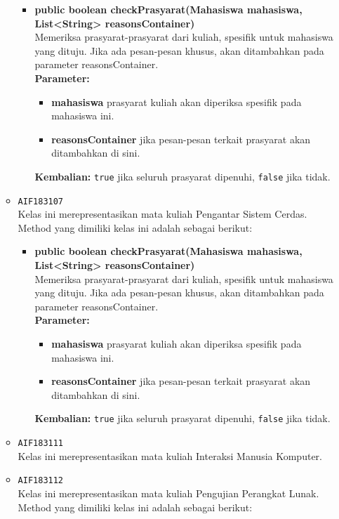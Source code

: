 \begin{enumerate}
\begin{itemize}
\begin{itemize}
\item \textbf{public boolean checkPrasyarat(Mahasiswa mahasiswa, List<String> reasonsContainer)}\\
Memeriksa prasyarat-prasyarat dari kuliah, spesifik untuk mahasiswa yang dituju. Jika ada pesan-pesan khusus, akan ditambahkan pada parameter reasonsContainer.\\
\textbf{Parameter:}
\begin{itemize}
\item \textbf{mahasiswa} prasyarat kuliah akan diperiksa spesifik pada mahasiswa ini.
\item \textbf{reasonsContainer} jika pesan-pesan terkait prasyarat akan ditambahkan di sini.
\end{itemize}
\textbf{Kembalian:} \texttt{true} jika seluruh prasyarat dipenuhi, \texttt{false} jika tidak.
\end{itemize}
\item \texttt{AIF183107} \\
Kelas ini merepresentasikan mata kuliah Pengantar Sistem Cerdas. Method yang dimiliki kelas ini adalah sebagai berikut: 
\begin{itemize}
\item \textbf{public boolean checkPrasyarat(Mahasiswa mahasiswa, List<String> reasonsContainer)}\\
Memeriksa prasyarat-prasyarat dari kuliah, spesifik untuk mahasiswa yang dituju. Jika ada pesan-pesan khusus, akan ditambahkan pada parameter reasonsContainer.\\
\textbf{Parameter:}
\begin{itemize}
\item \textbf{mahasiswa} prasyarat kuliah akan diperiksa spesifik pada mahasiswa ini.
\item \textbf{reasonsContainer} jika pesan-pesan terkait prasyarat akan ditambahkan di sini.
\end{itemize}
\textbf{Kembalian:} \texttt{true} jika seluruh prasyarat dipenuhi, \texttt{false} jika tidak.
\end{itemize}
\item \texttt{AIF183111} \\
Kelas ini merepresentasikan mata kuliah Interaksi Manusia Komputer.
\item \texttt{AIF183112} \\
Kelas ini merepresentasikan mata kuliah Pengujian Perangkat Lunak. Method yang dimiliki kelas ini adalah sebagai berikut: 
\begin{itemize}

\end{itemize}
\end{itemize}
\end{enumerate}
